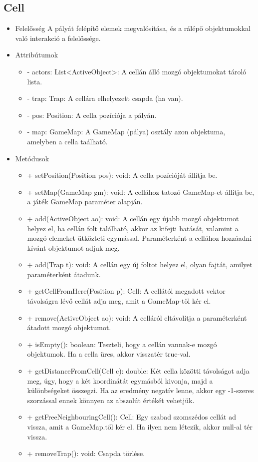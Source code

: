 \subsection{Cell}
\begin{itemize}
	\item Felelősség\newline
	A pályát felépítő elemek megvalósítása, és a rálépő objektumokkal való interakció a felelőssége.

	\item Attribútumok
		
	\begin{itemize}
		\item - actors: List<ActiveObject>: A cellán álló mozgó objektumokat tároló lista.
		\item - trap: Trap: A cellára elhelyezett csapda (ha van).
		\item - pos: Position: A cella pozíciója a pályán.
		\item - map: GameMap: A GameMap (pálya) osztály azon objektuma, amelyben a cella taálható.
	\end{itemize}
	\item Metódusok

	\begin{itemize}
		\item + setPosition(Position pos): void: A cella pozícióját állítja be.
		\item + setMap(GameMap gm): void: A cellához tatozó GameMap-et állítja be, a játék GameMap paraméter alapján.
		\item + add(ActiveObject ao): void: A cellán egy újabb mozgó objektumot helyez el, ha cellán folt található, akkor az kifejti hatását, valamint a mozgó elemeket ütközteti egymással. Paraméterként a cellához hozzáadni kívánt objektumot adjuk meg.
		\item + add(Trap t): void: A cellán egy új foltot helyez el, olyan fajtát, amilyet paraméterként átadunk.
		\item + getCellFromHere(Position p): Cell: A cellától megadott vektor távolságra lévő cellát adja meg, amit a GameMap-től kér el. 
		\item + remove(ActiveObject ao): void: A celláról eltávolítja a paraméterként átadott mozgó objektumot.
		\item + isEmpty(): boolean: Teszteli, hogy a cellán vannak-e mozgó objektumok. Ha a cella üres, akkor visszatér true-val. 
		\item + getDistanceFromCell(Cell c): double: Két cella közötti távolságot adja meg, úgy, hogy a két koordinátát egymásból kivonja, majd a különbségeket összegzi. Ha az eredmény negatív lenne, akkor egy -1-szeres szorzással ennek könnyen az abszolút értékét vehetjük.
		\item + getFreeNeighbouringCell(): Cell: Egy szabad szomszédos cellát ad vissza, amit a GameMap.től kér el. Ha ilyen nem létezik, akkor null-al tér vissza.
		\item + removeTrap(): void: Csapda törlése.
		
	\end{itemize}
\end{itemize}


